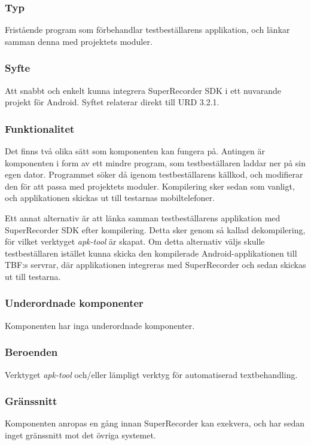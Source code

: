 \subsubsection{Typ}
Fristående program som förbehandlar testbeställarens applikation, och länkar samman denna med projektets moduler.

\subsubsection{Syfte}
Att snabbt och enkelt kunna integrera SuperRecorder SDK i ett nuvarande projekt för Android. Syftet relaterar direkt till URD 3.2.1.

\subsubsection{Funktionalitet}
Det finns två olika sätt som komponenten kan fungera på. Antingen är komponenten i form av ett mindre program, som testbeställaren laddar ner på sin egen dator. Programmet söker då igenom testbeställarens källkod, och modifierar den för att passa med projektets moduler. Kompilering sker sedan som vanligt, och applikationen skickas ut till testarnas mobiltelefoner. 

Ett annat alternativ är att länka samman testbeställarens applikation med SuperRecorder SDK efter kompilering. Detta sker genom så kallad dekompilering, för vilket verktyget \textit{apk-tool} är skapat. Om detta alternativ väljs skulle testbeställaren istället kunna skicka den kompilerade Android-applikationen till TBF:s servrar, där applikationen integreras med SuperRecorder och sedan skickas ut till testarna.

\subsubsection{Underordnade komponenter}
Komponenten har inga underordnade komponenter.

\subsubsection{Beroenden}
Verktyget \textit{apk-tool} och/eller lämpligt verktyg för automatiserad textbehandling.

\subsubsection{Gränssnitt}
Komponenten anropas en gång innan SuperRecorder kan exekvera, och har sedan inget gränssnitt mot det övriga systemet. 

